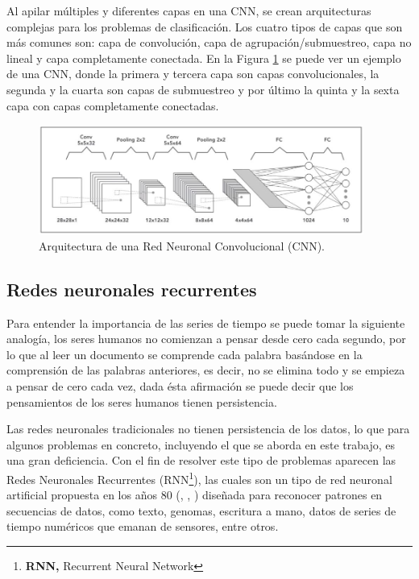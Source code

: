 \vspace{5mm} %

Al apilar múltiples y diferentes capas en una CNN, se crean arquitecturas complejas para los problemas de clasificación. Los cuatro tipos de capas que son más comunes son: capa de convolución, capa de agrupación/submuestreo, capa no lineal y capa completamente conectada. En la Figura \ref{fig:cnn} se puede ver un ejemplo de una CNN, donde la primera y tercera capa son capas convolucionales, la segunda y la cuarta son capas de submuestreo y por \'{u}ltimo la quinta y la sexta capa con capas completamente conectadas. 

\begin{figure}[h!]
  \begin{center}	\includegraphics[width=0.95\textwidth]{imagenes/Cap4/cnn}
  \caption{Arquitectura de una Red Neuronal Convolucional (CNN).}
  \label{fig:cnn}
  \end{center}
\end{figure}

\subsection{Redes neuronales recurrentes}

Para entender la importancia de las series de tiempo se puede tomar la siguiente analog\'{i}a, los seres humanos no comienzan a pensar desde cero cada segundo, por lo que al leer un documento se comprende cada palabra bas\'{a}ndose en la comprensi\'{o}n de las palabras anteriores, es decir, no se elimina todo y se empieza a pensar de cero cada vez, dada \'{e}sta afirmaci\'{o}n se puede decir que los pensamientos de los seres humanos tienen persistencia.

\vspace{5mm} %

Las redes neuronales tradicionales no tienen persistencia de los datos, lo que para algunos problemas en concreto, incluyendo el que se aborda en este trabajo, es una gran deficiencia. Con el fin de resolver este tipo de problemas aparecen las Redes Neuronales Recurrentes (RNN\footnote{\textbf{RNN,} Recurrent Neural Network}), las cuales son un tipo de red neuronal artificial propuesta en los a\~{n}os 80 (\cite{34}, \cite{35}, \cite{36}) dise\~{n}ada para reconocer patrones en secuencias de datos, como texto, genomas, escritura a mano, datos de series de tiempo num\'{e}ricos que emanan de sensores, entre otros.

